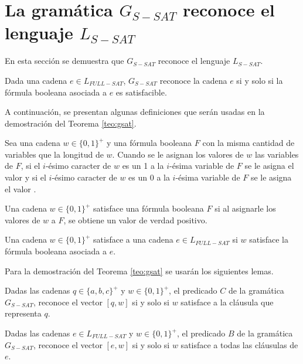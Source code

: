 \section{La gramática $G_{S-SAT}$ reconoce el lenguaje $L_{S-SAT}$}

En esta sección se demuestra que $G_{S-SAT}$ reconoce el lenguaje $L_{S-SAT}$.
\begin{theorem}
    \label{teo:gsat}
    Dada una cadena $e\in L_{FULL-SAT}$, $G_{S-SAT}$ reconoce la cadena $e$ si y solo si la fórmula booleana asociada a $e$ es satisfacible. 
\end{theorem}

A continuación, se presentan algunas definiciones que serán usadas en la demostración del Teorema \ref{teo:gsat}.

\begin{definition}
    Sea una cadena $w\in \{0,1\}^+$ y una fórmula booleana $F$ con la misma cantidad de variables que la longitud de 
    $w$. Cuando se le asignan los valores de $w$ las variables de $F$, si el $i$-ésimo caracter de $w$ es un 1 a la $i$-ésima variable de $F$ se le asigna
    el valor \true{} y si el $i$-ésimo caracter de $w$ es un 0 a la $i$-ésima variable de $F$ se le asigna
    el valor \false{}.
\end{definition}

\begin{definition}
    Una cadena  $w\in\{0,1\}^+$ satisface una fórmula booleana $F$ si al asignarle los valores de $w$ a $F$, se obtiene un valor de verdad positivo.
\end{definition}

\begin{definition}
    Una cadena $w\in\{0,1\}^+$ satisface a una cadena $e\in L_{FULL-SAT}$ si $w$ satisface la fórmula booleana asociada a $e$. 
\end{definition}

Para la demostración del Teorema \ref{teo:gsat} se usarán los siguientes lemas.

\begin{lemma}
    \label{lem:predc}
    Dadas las cadenas $q\in \{a,b,c\}^+$ y $w\in \{0,1\}^+$, el predicado $C$ de la gramática $G_{S-SAT}$, reconoce el vector $[q,w]$ si y solo si $w$ satisface a la cláusula que representa $q$.
\end{lemma}

\begin{lemma}
    \label{lem:predb}
    Dadas las cadenas $e\in L_{FULL-SAT}$ y $w\in \{0,1\}^+$, el predicado $B$ de la gramática $G_{S-SAT}$, reconoce el vector $[e,w]$  si y solo si $w$ satisface a todas las cláusulas de $e$.
\end{lemma}

